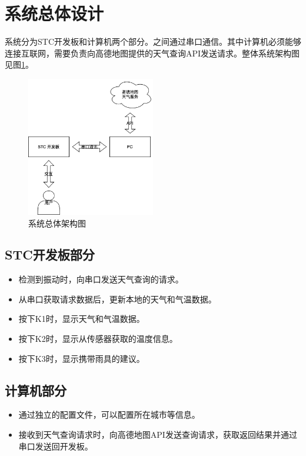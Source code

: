 \documentclass{article}
\begin{document}
\section{系统总体设计}

系统分为STC开发板和计算机两个部分。之间通过串口通信。其中计算机必须能够连接互联网，需要负责向高德地图提供的天气查询API发送请求。整体系统架构图见图\ref{fig:system}。

\begin{figure}[h]
    \centering
    \includegraphics[width=0.5\textwidth]{system}
    \caption{系统总体架构图}
    \label{fig:system}
\end{figure}

\subsection{STC开发板部分}

\begin{itemize}
  \item 检测到振动时，向串口发送天气查询的请求。
  \item 从串口获取请求数据后，更新本地的天气和气温数据。
  \item 按下K1时，显示天气和气温数据。
  \item 按下K2时，显示从传感器获取的温度信息。
  \item 按下K3时，显示携带雨具的建议。
\end{itemize}

\subsection{计算机部分}

\begin{itemize}
  \item 通过独立的配置文件，可以配置所在城市等信息。
  \item 接收到天气查询请求时，向高德地图API发送查询请求，获取返回结果并通过串口发送回开发板。
\end{itemize}
\end{document}
